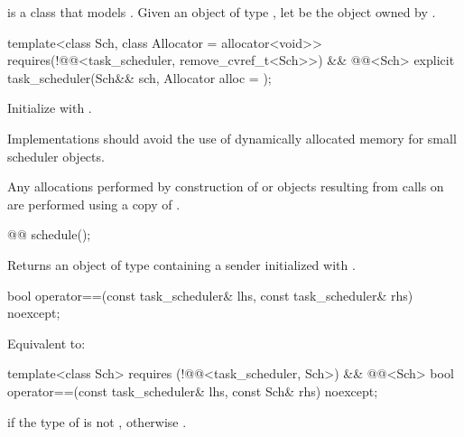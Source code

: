 \pnum
{} is a class that models
.
Given an object  of type , let
 be the object owned by .

\begin{itemdecl}
template<class Sch, class Allocator = allocator<void>>
  requires(!@@<task_scheduler, remove_cvref_t<Sch>>) && @@<Sch>
explicit task_scheduler(Sch&& sch, Allocator alloc = {});
\end{itemdecl}
\begin{itemdescr}
\pnum
\effects
Initialize  with
.

\pnum
\recommended
Implementations should avoid the use of dynamically
allocated memory for small scheduler objects.

\pnum
\remarks
Any allocations performed by construction of  or
 objects resulting from calls on  are
performed using a copy of .
\end{itemdescr}

%
\begin{itemdecl}
@@ schedule();
\end{itemdecl}
\begin{itemdescr}
\pnum
\effects
Returns an object of type  containing a sender
initialized with .
\end{itemdescr}

%
\begin{itemdecl}
bool operator==(const task_scheduler& lhs, const task_scheduler& rhs) noexcept;
\end{itemdecl}
\begin{itemdescr}
\pnum
\effects
Equivalent to: 
\end{itemdescr}

%
\begin{itemdecl}
template<class Sch>
  requires (!@@<task_scheduler, Sch>)
        && @@<Sch>
bool operator==(const task_scheduler& lhs, const Sch& rhs) noexcept;
\end{itemdecl}
\begin{itemdescr}
\pnum
\returns
{} if the type of  is not ,
otherwise .
\end{itemdescr}

